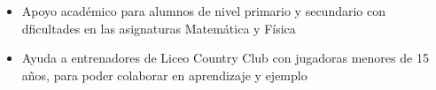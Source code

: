 \documentclass[10pt,a4paper,ragged2e,withhyper]{altacv}
\begin{document}
\begin{paracol}{2}


\begin{itemize}
\item  Apoyo académico para alumnos de nivel primario y secundario con dficultades en las asignaturas Matemática y Física

\end{itemize}

\divider
{}
\begin{itemize}
\item  Ayuda a entrenadores de Liceo Country Club con jugadoras menores de 15 años, para poder colaborar en aprendizaje y ejemplo

\end{itemize}









\end{paracol}
\end{document}
